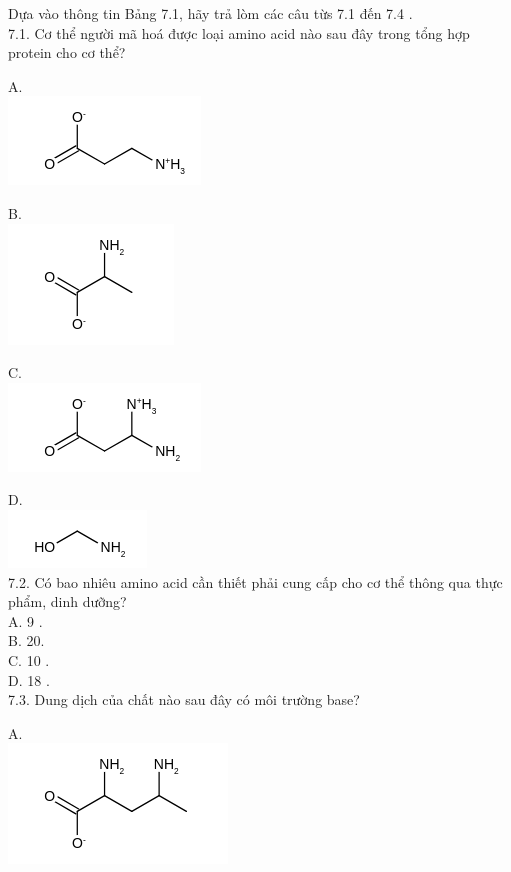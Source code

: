 \documentclass[10pt]{article}
\begin{document}
Dựa vào thông tin Bảng 7.1, hãy trả lòm các câu từs 7.1 đến 7.4 .\\
7.1. Cơ thể người mã hoá được loại amino acid nào sau đây trong tổng hợp protein cho cơ thể?

A.\\
\includegraphics{smile-a694c6c53383c54ad907de7534f88cbd00b64acb}

B.\\
\includegraphics{smile-0c3043077e6742aaeee772feb054b7fee3275be5}

C.\\
\includegraphics{smile-1964245802b57b389591fdd6009edc0d1c558d56}

D.\\
\includegraphics{smile-b81539fb90153fb5cc8a718f98026785b46562b5}\\
7.2. Có bao nhiêu amino acid cần thiết phải cung cấp cho cơ thể thông qua thực phẩm, dinh dưỡng?\\
A. 9 .\\
B. 20.\\
C. 10 .\\
D. 18 .\\
7.3. Dung dịch của chất nào sau đây có môi trường base?

A.\\
\includegraphics{smile-b6f711f4d5a67bd8e14143f032864e78c8363747}
\end{document}
